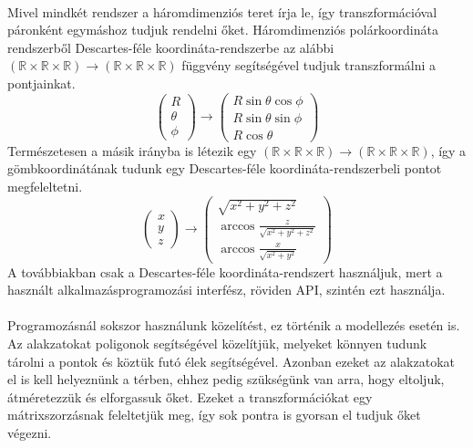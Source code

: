 \documentclass[12pt]{report}
\begin{document}
\paragraph{}
Mivel mindkét rendszer a háromdimenziós teret írja le, így transzformációval páronként egymáshoz tudjuk rendelni őket.
Háromdimenziós polárkoordináta rendszerből Descartes-féle koordináta-rendszerbe az alábbi $(\mathbb{R} \times \mathbb{R} \times \mathbb{R}) \rightarrow (\mathbb{R} \times \mathbb{R} \times \mathbb{R})$ függvény segítségével tudjuk transzformálni a pontjainkat.
$$
\left( \begin{array}{c}
	R \\
	\theta \\
	\phi \end{array}
\right)
\rightarrow
\left( \begin{array}{c}
	R \sin \theta \cos \phi \\
	R \sin \theta \sin \phi \\
	R \cos \theta
\end{array} \right)
$$
Természetesen a másik irányba is létezik egy $(\mathbb{R} \times \mathbb{R} \times \mathbb{R}) \rightarrow (\mathbb{R} \times \mathbb{R} \times \mathbb{R})$, így a gömbkoordinátának tudunk egy Descartes-féle koordináta-rendszerbeli pontot megfeleltetni.
$$
\left( \begin{array}{c}
	x \\
	y \\
	z \end{array}
\right)
\rightarrow
\left( \begin{array}{c}
	\sqrt{x^2+y^2+z^2} \\
	\arccos{\frac{z}{\sqrt{x^2+y^2+z^2}}} \\
	\arccos{\frac{x}{\sqrt{x^2+y^2}}}
\end{array} \right)
$$
A továbbiakban csak a Descartes-féle koordináta-rendszert használjuk, mert a használt alkalmazásprogramozási interfész, röviden API, szintén ezt használja.
\paragraph{}
Programozásnál sokszor használunk közelítést, ez történik a modellezés esetén is. Az alakzatokat poligonok segítségével közelítjük, melyeket könnyen tudunk tárolni a pontok és köztük futó élek segítségével. Azonban ezeket az alakzatokat el is kell helyeznünk a térben, ehhez pedig szükségünk van arra, hogy eltoljuk, átméretezzük és elforgassuk őket. Ezeket a transzformációkat egy mátrixszorzásnak feleltetjük meg, így sok pontra is gyorsan el tudjuk őket végezni.
\end{document}
